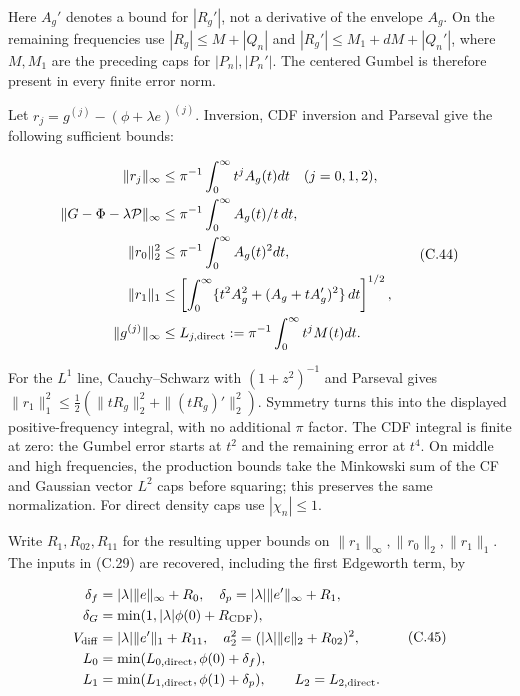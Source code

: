 \documentclass{article}
\begin{document}
Here \(A_g'\) denotes a bound for \(|R_g'|\), not a derivative of the
envelope \(A_g\). On the remaining frequencies use \(|R_g|\le M+|Q_n|\)
and \(|R_g'|\le M_1+dM+|Q_n'|\), where \(M,M_1\) are the preceding caps
for \(|P_n|,|P_n'|\). The centered Gumbel is therefore present in every
finite error norm.

Let \(r_j=g^{(j)}-(\phi+\lambda e)^{(j)}\). Inversion, CDF inversion and
Parseval give the following sufficient bounds:

\[
\begin{aligned}
\|r_j\|_\infty&\le\pi^{-1}\int_0^\infty t^jA_g(t)dt\quad(j=0,1,2),\\
\|G-\Phi-\lambda\mathcal P\|_\infty&\le\pi^{-1}\int_0^\infty A_g(t)/t\,dt,\\
\|r_0\|_2^2&\le\pi^{-1}\int_0^\infty A_g(t)^2dt,\\
\|r_1\|_1&\le\left[\int_0^\infty\{t^2A_g^2+(A_g+tA_g')^2\}\,dt\right]^{1/2},\\
\|g^{(j)}\|_\infty&\le L_{j,\rm direct}:=\pi^{-1}\int_0^\infty t^jM(t)dt.
\end{aligned}
\tag{C.44}
\]

For the \(L^1\) line, Cauchy--Schwarz with \((1+z^2)^{-1}\) and Parseval
gives \(\|r_1\|_1^2\le\tfrac12(\|tR_g\|_2^2+\|(tR_g)'\|_2^2)\). Symmetry
turns this into the displayed positive-frequency integral, with no
additional \(\pi\) factor. The CDF integral is finite at zero: the
Gumbel error starts at \(t^2\) and the remaining error at \(t^4\). On
middle and high frequencies, the production bounds take the Minkowski
sum of the CF and Gaussian vector \(L^2\) caps before squaring; this
preserves the same normalization. For direct density caps use
\(|\chi_n|\le1\).

Write \(R_1,R_{02},R_{11}\) for the resulting upper bounds on
\(\|r_1\|_\infty,\|r_0\|_2,\|r_1\|_1\). The inputs in (C.29) are
recovered, including the first Edgeworth term, by

\[
\begin{aligned}
\delta_f&=|\lambda|\|e\|_\infty+R_0,\quad
\delta_p=|\lambda|\|e'\|_\infty+R_1,\\
\delta_G&=\min(1,|\lambda|\phi(0)+R_{\rm CDF}),\\
V_{\rm diff}&=|\lambda|\|e'\|_1+R_{11},\quad
 a_2^2=(|\lambda|\|e\|_2+R_{02})^2,\\
L_0&=\min(L_{0,\rm direct},\phi(0)+\delta_f),\\
L_1&=\min(L_{1,\rm direct},\phi(1)+\delta_p),\qquad L_2=L_{2,\rm direct}.
\end{aligned}
\tag{C.45}
\]
\end{document}
